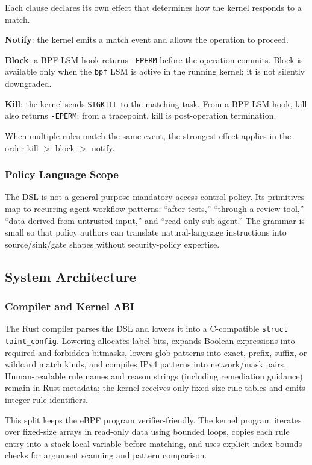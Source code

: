 Each clause declares its own effect that determines how the kernel
responds to a match.

\textbf{Notify}: the kernel emits a match event and allows the operation
to proceed.

\textbf{Block}: a BPF-LSM hook returns \texttt{-EPERM} before the operation
commits. Block is available only when the \texttt{bpf} LSM is active in the
running kernel; it is not silently downgraded.

\textbf{Kill}: the kernel sends \texttt{SIGKILL} to the matching task. From
a BPF-LSM hook, kill also returns \texttt{-EPERM}; from a tracepoint, kill
is post-operation termination.

When multiple rules match the same event, the strongest effect applies in
the order kill $>$ block $>$ notify.

\subsubsection{Policy Language Scope}

The DSL is not a general-purpose mandatory access control policy. Its
primitives map to recurring agent workflow patterns: ``after tests,''
``through a review tool,'' ``data derived from untrusted input,'' and
``read-only sub-agent.'' The grammar is small so that policy authors can
translate natural-language instructions into source/sink/gate shapes without
security-policy expertise.

\subsection{System Architecture}

\subsubsection{Compiler and Kernel ABI}

The Rust compiler parses the DSL and lowers it into a C-compatible
\texttt{struct taint\_config}. Lowering allocates label bits, expands Boolean
expressions into required and forbidden bitmasks, lowers glob patterns into
exact, prefix, suffix, or wildcard match kinds, and compiles IPv4 patterns
into network/mask pairs. Human-readable rule names and reason strings
(including remediation guidance) remain in Rust metadata; the kernel receives
only fixed-size rule tables and emits integer rule identifiers.

This split keeps the eBPF program verifier-friendly. The kernel program
iterates over fixed-size arrays in read-only data using bounded loops, copies
each rule entry into a stack-local variable before matching, and uses explicit
index bounds checks for argument scanning and pattern comparison.

